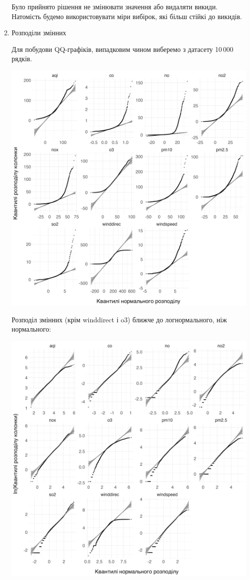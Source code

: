 \documentclass{article}
\begin{document}
\begin{enumerate}
    Було прийнято рішення не змінювати значення або видаляти викиди. Натомість будемо
    використовувати міри вибірок, які більш стійкі до викидів. 

    \pagebreak

    \item Розподіли змінних

    Для побудови QQ-графіків, випадковим чином виберемо з датасету 10\,000 рядків.

    \includegraphics[width=5.5in]{plots/qq_tidy/qq.png}

    \pagebreak
    
    Розподіл змінних (крім winddirect і o3) ближче до логнормального, ніж нормального:

    \includegraphics[width=5.5in]{plots/qq_tidy/qq-log.png}
    

\end{enumerate}
\end{document}
